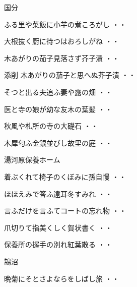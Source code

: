 \vspace{0.4cm}
国分
\begin{shiika}ふる里や菜飯に小芋の煮ころがし
\hfill{・・}\end{shiika}
\begin{shiika}大根抜く厨に待つはおろしがね
\hfill{・・}\end{shiika}
\begin{shiika}木あがりの茄子見落さず芥子漬
\hfill{・・}\end{shiika}
\begin{shiika}添削 木あがりの茄子と思へぬ芥子漬
\hfill{・・}\end{shiika}
\begin{shiika}そつと出る夫追ふ妻や露の畑
\hfill{・・}\end{shiika}
\begin{shiika}医と寺の娘が幼な友木の葉髪
\hfill{・・}\end{shiika}
\begin{shiika}秋風や札所の寺の大礎石
\hfill{・・}\end{shiika}
\begin{shiika}木犀匂ふ金銀並びし故里の庭
\hfill{・・}\end{shiika}
\vspace{0.4cm}
湯河原保養ホーム
\begin{shiika}着ぶくれて椅子のくぼみに孫自慢
\hfill{・・}\end{shiika}
\begin{shiika}ほほえみで答ふ遠耳冬すみれ
\hfill{・・}\end{shiika}
\begin{shiika}言ふだけを言ふてコートの忘れ物
\hfill{・・}\end{shiika}
\begin{shiika}爪切りて指美くしく賀状書く
\hfill{・・}\end{shiika}
\begin{shiika}保養所の握手の別れ紅葉散る
\hfill{・・}\end{shiika}
\vspace{0.4cm}
鵠沼
\begin{shiika}晩菊にそとさよならをしばし旅
\hfill{・・}\end{shiika}
